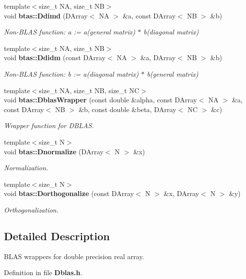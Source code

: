 \begin{DoxyCompactItemize}
{\footnotesize template$<$size\-\_\-t N\-A, size\-\_\-t N\-B$>$ }\\void {\bf btas\-::\-Ddimd} (D\-Array$<$ N\-A $>$ \&a, const D\-Array$<$ N\-B $>$ \&b)
\begin{DoxyCompactList}\small\item\em Non-\/\-B\-L\-A\-S function\-: a \-:= a(general matrix) $\ast$ b(diagonal matrix) \end{DoxyCompactList}\item 
{\footnotesize template$<$size\-\_\-t N\-A, size\-\_\-t N\-B$>$ }\\void {\bf btas\-::\-Ddidm} (const D\-Array$<$ N\-A $>$ \&a, D\-Array$<$ N\-B $>$ \&b)
\begin{DoxyCompactList}\small\item\em Non-\/\-B\-L\-A\-S function\-: b \-:= a(diagonal matrix) $\ast$ b(general matrix) \end{DoxyCompactList}\item 
{\footnotesize template$<$size\-\_\-t N\-A, size\-\_\-t N\-B, size\-\_\-t N\-C$>$ }\\void {\bf btas\-::\-Dblas\-Wrapper} (const double \&alpha, const D\-Array$<$ N\-A $>$ \&a, const D\-Array$<$ N\-B $>$ \&b, const double \&beta, D\-Array$<$ N\-C $>$ \&c)
\begin{DoxyCompactList}\small\item\em Wrapper function for D\-B\-L\-A\-S. \end{DoxyCompactList}\item 
{\footnotesize template$<$size\-\_\-t N$>$ }\\void {\bf btas\-::\-Dnormalize} (D\-Array$<$ N $>$ \&x)
\begin{DoxyCompactList}\small\item\em Normalization. \end{DoxyCompactList}\item 
{\footnotesize template$<$size\-\_\-t N$>$ }\\void {\bf btas\-::\-Dorthogonalize} (const D\-Array$<$ N $>$ \&x, D\-Array$<$ N $>$ \&y)
\begin{DoxyCompactList}\small\item\em Orthogonalization. \end{DoxyCompactList}\end{DoxyCompactItemize}


\subsection{Detailed Description}
B\-L\-A\-S wrappers for double precision real array. 

Definition in file {\bf Dblas.\-h}.

